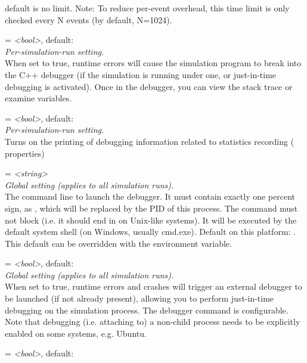 \begin{description}
    default is no limit. Note: To reduce per-event overhead, this time limit is
    only checked every N events (by default, N=1024).
\item[debug-on-errors] = \textit{<bool>}, default: \\
    \textit{Per-simulation-run setting.}\\
    When set to true, runtime errors will cause the simulation program to break
    into the C++ debugger (if the simulation is running under one, or
    just-in-time debugging is activated). Once in the debugger, you can view
    the stack trace or examine variables.
\item[debug-statistics-recording] = \textit{<bool>}, default: \\
    \textit{Per-simulation-run setting.}\\
    Turns on the printing of debugging information related to statistics
    recording ( properties)
\item[debugger-attach-command] = \textit{<string>}\\
    \textit{Global setting (applies to all simulation runs).}\\
    The command line to launch the debugger. It must contain exactly one
    percent sign, as , which will be replaced by the PID of this
    process. The command must not block (i.e. it should end in \ttt{\&} on
    Unix-like systems). It will be executed by the default system shell (on
    Windows, usually cmd.exe). Default on this platform: .
    This default can be overridden with the 
    environment variable.
\item[debugger-attach-on-error] = \textit{<bool>}, default: \\
    \textit{Global setting (applies to all simulation runs).}\\
    When set to true, runtime errors and crashes will trigger an external
    debugger to be launched (if not already present), allowing you to perform
    just-in-time debugging on the simulation process. The debugger command is
    configurable. Note that debugging (i.e. attaching to) a non-child process
    needs to be explicitly enabled on some systems, e.g. Ubuntu.
\item[debugger-attach-on-startup] = \textit{<bool>}, default: \\

\end{description}
